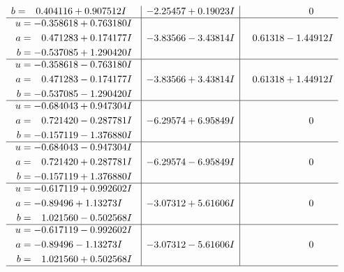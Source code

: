 \documentclass[1p]{elsarticle_modified}
\theoremstyle{definition}
\begin{document}
$$\begin{array}{c|c|c}
\begin{aligned}
b &= \phantom{-}0.404116 + 0.907512 I\end{aligned}
 & -2.25457 + 0.19023 I & \phantom{-0.000000 } 0 \\ \hline\begin{aligned}
u &= -0.358618 + 0.763180 I \\
a &= \phantom{-}0.471283 + 0.174177 I \\
b &= -0.537085 + 1.290420 I\end{aligned}
 & -3.83566 - 3.43814 I & \phantom{-}0.61318 - 1.44912 I \\ \hline\begin{aligned}
u &= -0.358618 - 0.763180 I \\
a &= \phantom{-}0.471283 - 0.174177 I \\
b &= -0.537085 - 1.290420 I\end{aligned}
 & -3.83566 + 3.43814 I & \phantom{-}0.61318 + 1.44912 I \\ \hline\begin{aligned}
u &= -0.684043 + 0.947304 I \\
a &= \phantom{-}0.721420 - 0.287781 I \\
b &= -0.157119 - 1.376880 I\end{aligned}
 & -6.29574 + 6.95849 I & \phantom{-0.000000 } 0 \\ \hline\begin{aligned}
u &= -0.684043 - 0.947304 I \\
a &= \phantom{-}0.721420 + 0.287781 I \\
b &= -0.157119 + 1.376880 I\end{aligned}
 & -6.29574 - 6.95849 I & \phantom{-0.000000 } 0 \\ \hline\begin{aligned}
u &= -0.617119 + 0.992602 I \\
a &= -0.89496 + 1.13273 I \\
b &= \phantom{-}1.021560 - 0.502568 I\end{aligned}
 & -3.07312 + 5.61606 I & \phantom{-0.000000 } 0 \\ \hline\begin{aligned}
u &= -0.617119 - 0.992602 I \\
a &= -0.89496 - 1.13273 I \\
b &= \phantom{-}1.021560 + 0.502568 I\end{aligned}
 & -3.07312 - 5.61606 I & \phantom{-0.000000 } 0\\
 \hline 
 \end{array}$$\newpage$$\begin{array}{c|c|c}  

\end{array}$$
\end{document}

